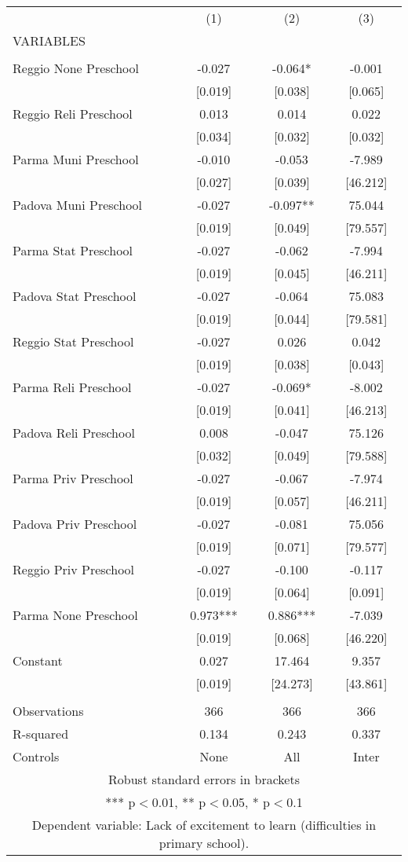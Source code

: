 \begin{tabular}{lccc} \hline
 & (1) & (2) & (3) \\
VARIABLES &  &  &  \\ \hline
 &  &  &  \\
Reggio None Preschool & -0.027 & -0.064* & -0.001 \\
 & [0.019] & [0.038] & [0.065] \\
Reggio Reli Preschool & 0.013 & 0.014 & 0.022 \\
 & [0.034] & [0.032] & [0.032] \\
Parma Muni Preschool & -0.010 & -0.053 & -7.989 \\
 & [0.027] & [0.039] & [46.212] \\
Padova Muni Preschool & -0.027 & -0.097** & 75.044 \\
 & [0.019] & [0.049] & [79.557] \\
Parma Stat Preschool & -0.027 & -0.062 & -7.994 \\
 & [0.019] & [0.045] & [46.211] \\
Padova Stat Preschool & -0.027 & -0.064 & 75.083 \\
 & [0.019] & [0.044] & [79.581] \\
Reggio Stat Preschool & -0.027 & 0.026 & 0.042 \\
 & [0.019] & [0.038] & [0.043] \\
Parma Reli Preschool & -0.027 & -0.069* & -8.002 \\
 & [0.019] & [0.041] & [46.213] \\
Padova Reli Preschool & 0.008 & -0.047 & 75.126 \\
 & [0.032] & [0.049] & [79.588] \\
Parma Priv Preschool & -0.027 & -0.067 & -7.974 \\
 & [0.019] & [0.057] & [46.211] \\
Padova Priv Preschool & -0.027 & -0.081 & 75.056 \\
 & [0.019] & [0.071] & [79.577] \\
Reggio Priv Preschool & -0.027 & -0.100 & -0.117 \\
 & [0.019] & [0.064] & [0.091] \\
Parma None Preschool & 0.973*** & 0.886*** & -7.039 \\
 & [0.019] & [0.068] & [46.220] \\
Constant & 0.027 & 17.464 & 9.357 \\
 & [0.019] & [24.273] & [43.861] \\
 &  &  &  \\
Observations & 366 & 366 & 366 \\
R-squared & 0.134 & 0.243 & 0.337 \\
 Controls & None & All & Inter \\ \hline
\multicolumn{4}{c}{ Robust standard errors in brackets} \\
\multicolumn{4}{c}{ *** p$<$0.01, ** p$<$0.05, * p$<$0.1} \\
\multicolumn{4}{c}{ Dependent variable: Lack of excitement to learn (difficulties in primary school).} \\
\end{tabular}
